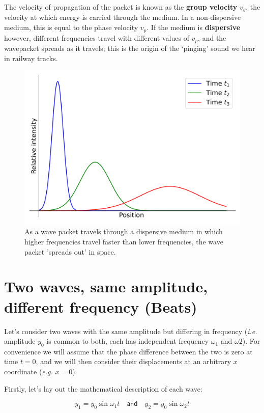 \documentclass[
]{book}
\begin{document}
The velocity of propagation of the packet is known as the \textbf{group velocity} \(v_g\), the velocity at which energy is carried through the medium. In a non-dispersive medium, this is equal to the phase velocity \(v_p\). If the medium is \textbf{dispersive} however, different frequencies travel with different values of \(v_p\), and the wavepacket spreads as it travels; this is the origin of the `pinging' sound we hear in railway tracks.

\begin{figure}

{\centering \includegraphics[width=0.7\linewidth]{visualisations/ch12-wavepacketdispersion1} 

}

\caption{As a wave packet travels through a dispersive medium in which higher frequencies travel faster than lower frequencies, the wave packet 'spreads out' in space.}\label{fig:ch12-dispersionillustration1}
\end{figure}

\hypertarget{sec:ch12-twowavesbeats1}{%
\section{Two waves, same amplitude, different frequency (Beats)}\label{sec:ch12-twowavesbeats1}}

Let's consider two waves with the same amplitude but differing in frequency (\emph{i.e.} amplitude \(y_0\) is common to both, each has independent frequency \(\omega_1\) and \(\omega 2\)). For convenience we will assume that the phase difference between the two is zero at time \(t=0\), and we will then consider their displacements at an arbitrary \(x\) coordinate (\emph{e.g.} \(x=0\)).

Firstly, let's lay out the mathematical description of each wave:

\begin{equation}
y_{1} = y_{0} \sin \omega_{1} t \quad \textsf{and} \quad y_{2} = y_{0} \sin \omega_{2} t
\label{eq:ch12-addtwowavebeats1}
\end{equation}
\end{document}
